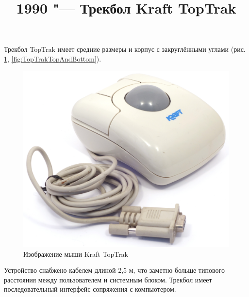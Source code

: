 \documentclass[11pt, a4paper]{article}
\begin{document}
\title{1990 "--- Трекбол Kraft TopTrak}
\date{}
\maketitle

Трекбол TopTrak имеет средние размеры и корпус с закруглёнными углами (рис. \ref{fig:TopTrakPic}, \ref{fig:TopTrakTopAndBottom}).

\begin{figure}[h]
    \centering
    \includegraphics[scale=0.45]{1990_kraft_toptrack/pic_60.jpg}
    \caption{Изображение мыши Kraft TopTrak}
    \label{fig:TopTrakPic}
\end{figure}

 Устройство снабжено кабелем длиной 2,5 м, что заметно больше типового расстояния между пользователем и системным блоком. Трекбол имеет последовательный интерфейс сопряжения с компьютером.
\end{document}
